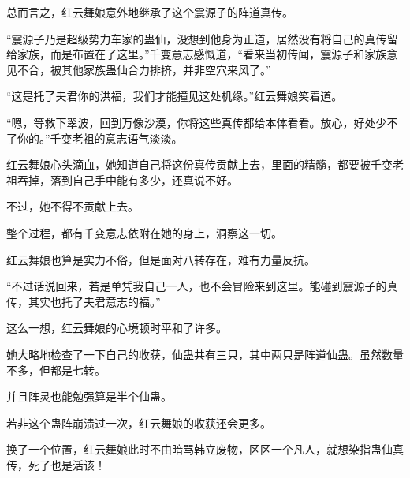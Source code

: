 \begin{this_body}
总而言之，红云舞娘意外地继承了这个震源子的阵道真传。

“震源子乃是超级势力车家的蛊仙，没想到他身为正道，居然没有将自己的真传留给家族，而是布置在了这里。”千变意志感慨道，“看来当初传闻，震源子和家族意见不合，被其他家族蛊仙合力排挤，并非空穴来风了。”

“这是托了夫君你的洪福，我们才能撞见这处机缘。”红云舞娘笑着道。

“嗯，等救下翠波，回到万像沙漠，你将这些真传都给本体看看。放心，好处少不了你的。”千变老祖的意志语气淡淡。

红云舞娘心头滴血，她知道自己将这份真传贡献上去，里面的精髓，都要被千变老祖吞掉，落到自己手中能有多少，还真说不好。

不过，她不得不贡献上去。

整个过程，都有千变意志依附在她的身上，洞察这一切。

红云舞娘也算是实力不俗，但是面对八转存在，难有力量反抗。

“不过话说回来，若是单凭我自己一人，也不会冒险来到这里。能碰到震源子的真传，其实也托了夫君意志的福。”

这么一想，红云舞娘的心境顿时平和了许多。

她大略地检查了一下自己的收获，仙蛊共有三只，其中两只是阵道仙蛊。虽然数量不多，但都是七转。

并且阵灵也能勉强算是半个仙蛊。

若非这个蛊阵崩溃过一次，红云舞娘的收获还会更多。

换了一个位置，红云舞娘此时不由暗骂韩立废物，区区一个凡人，就想染指蛊仙真传，死了也是活该！

\end{this_body}

